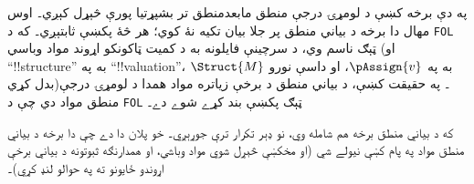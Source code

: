 \documentclass[../../include/open-logic-part]{subfiles}
\begin{document}

\begin{editorial}
  په دې برخه کښې د لومړۍ درجې منطق مابعدمنطق تر بشپړتيا پورې
  څېړل کېږي۔ اوس مهال دا برخه د بياني منطق پر جلا بيان تکيه نۀ
  کوي؛ هر څۀ پکښې ثابتېږي۔ که د \texttt{FOL} ټېګ ناسم وي، د سرچينې
  فايلونه به د کميت ټاکونکو اړوند مواد وباسي (او
  ``!!{structure}'' به په ``!!{valuation}''، $\Struct{M}$ به په
  $\pAssign{v}$، او داسې نورو بدل کړي)۔ په حقيقت کښې، د بياني منطق
  د برخې زياتره مواد همدا د لومړۍ درجې منطق مواد دي چې د \texttt{FOL}
  ټېګ پکښې بند کړے شوے دے۔

  که د بياني منطق برخه هم شامله وي، نو ډېر تکرار ترې جوړېږي۔ خو
  پلان دا دے چې دا برخه د بياني منطق مواد په پام کښې نيولے شي (او
  مخکښې څېړل شوي مواد وباسي، او همدارنګه ثبوتونه د بياني برخې
  اړوندو ځايونو ته په حوالو لنډ کړي)۔
\end{editorial}












\OLEndPartHook
\end{document}
